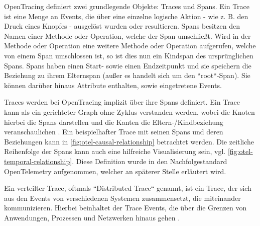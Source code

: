 OpenTracing definiert zwei grundlegende Objekte: Traces und Spans. Ein Trace ist eine Menge an Events, die über eine einzelne logische Aktion - wie z. B. den Druck eines Knopfes - ausgelöst wurden oder resultieren. Spans besitzen den Namen einer Methode oder Operation, welche der Span umschließt. Wird in der Methode oder Operation eine weitere Methode oder Operation aufgerufen, welche von einem Span umschlossen ist, so ist dies nun ein Kindspan des ursprünglichen Spans. Spans haben einen Start- sowie einen Endzeitpunkt und sie speichern die Beziehung zu ihrem Elternspan (außer es handelt sich um den ``root``-Span). Sie können darüber hinaus Attribute enthalten, sowie eingetretene Events.

Traces werden bei OpenTracing implizit über ihre Spans definiert. Ein Trace kann als ein gerichteter Graph ohne Zyklus verstanden werden, wobei die Knoten hierbei die Spans darstellen und die Kanten die Eltern-/Kindbeziehung veranschaulichen \cite{OpenTracingSpecification}. Ein beispielhafter Trace mit seinen Spans und deren Beziehungen kann in \autoref{fig:otel-causal-relationship} betrachtet werden. Die zeitliche Reihenfolge der Spans kann auch eine hilfreiche Visualisierung sein, vgl. \autoref{fig:otel-temporal-relationship}. Diese Definition wurde in den Nachfolgestandard OpenTelemetry aufgenommen, welcher an späterer Stelle erläutert wird.

Ein verteilter Trace, oftmals ``Distributed Trace`` genannt, ist ein Trace, der sich aus den Events von verschiedenen Systemen zusammensetzt, die miteinander kommunizieren. Hierbei beinhaltet der Trace Events, die über die Grenzen von Anwendungen, Prozessen und Netzwerken hinaus gehen \cite{OpenTracingSpecification}.

